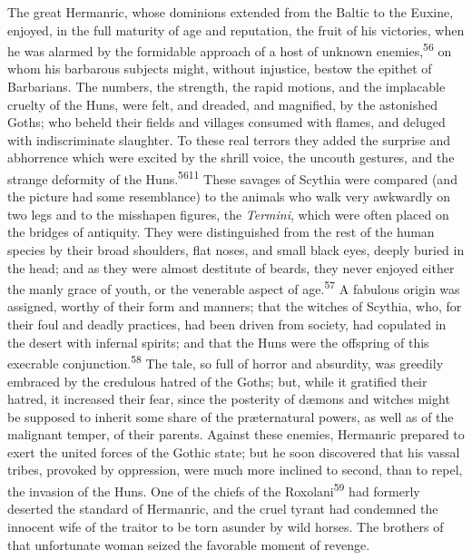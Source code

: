 

The great Hermanric, whose dominions extended from the Baltic to
the Euxine, enjoyed, in the full maturity of age and reputation,
the fruit of his victories, when he was alarmed by the formidable
approach of a host of unknown enemies,\textsuperscript{56} on whom his barbarous
subjects might, without injustice, bestow the epithet of
Barbarians. The numbers, the strength, the rapid motions, and the
implacable cruelty of the Huns, were felt, and dreaded, and
magnified, by the astonished Goths; who beheld their fields and
villages consumed with flames, and deluged with indiscriminate
slaughter. To these real terrors they added the surprise and
abhorrence which were excited by the shrill voice, the uncouth
gestures, and the strange deformity of the Huns.\textsuperscript{5611} These
savages of Scythia were compared (and the picture had some
resemblance) to the animals who walk very awkwardly on two legs
and to the misshapen figures, the \textit{Termini}, which were often
placed on the bridges of antiquity. They were distinguished from
the rest of the human species by their broad shoulders, flat
noses, and small black eyes, deeply buried in the head; and as
they were almost destitute of beards, they never enjoyed either
the manly grace of youth, or the venerable aspect of age.\textsuperscript{57} A
fabulous origin was assigned, worthy of their form and manners;
that the witches of Scythia, who, for their foul and deadly
practices, had been driven from society, had copulated in the
desert with infernal spirits; and that the Huns were the
offspring of this execrable conjunction.\textsuperscript{58} The tale, so full of
horror and absurdity, was greedily embraced by the credulous
hatred of the Goths; but, while it gratified their hatred, it
increased their fear, since the posterity of dæmons and witches
might be supposed to inherit some share of the præternatural
powers, as well as of the malignant temper, of their parents.
Against these enemies, Hermanric prepared to exert the united
forces of the Gothic state; but he soon discovered that his
vassal tribes, provoked by oppression, were much more inclined to
second, than to repel, the invasion of the Huns. One of the
chiefs of the Roxolani\textsuperscript{59} had formerly deserted the standard of
Hermanric, and the cruel tyrant had condemned the innocent wife
of the traitor to be torn asunder by wild horses. The brothers of
that unfortunate woman seized the favorable moment of revenge.

